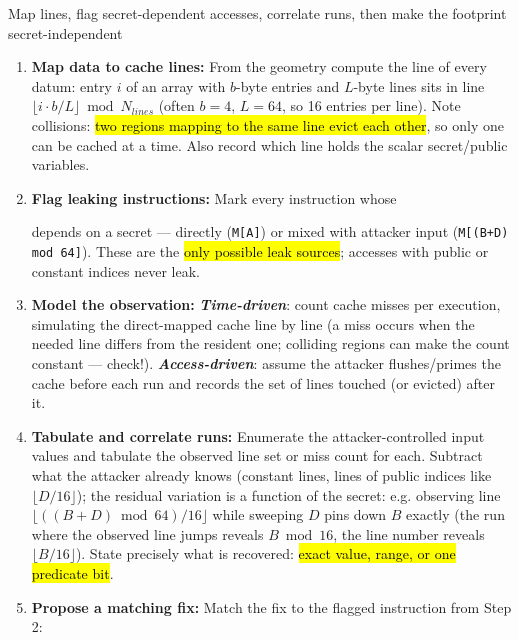 \documentclass[12pt, a4paper]{article}
\newcommand{\term}[1]{\textbf{\textit{#1}}}        %
\newcommand{\imp}[1]{\hl{#1}}                       %
\begin{document}
\begin{schemebox}{Map lines, flag secret-dependent accesses, correlate runs, then make the footprint secret-independent}
\begin{enumerate}[label=\textbf{Step \arabic*:}, leftmargin=*]
    \item \textbf{Map data to cache lines:} From the geometry compute the line of every datum: entry $i$ of an array with $b$-byte entries and $L$-byte lines sits in line $\lfloor i \cdot b / L \rfloor \bmod N_{lines}$ (often $b=4$, $L=64$, so 16 entries per line). Note collisions: \imp{two regions mapping to the same line evict each other}, so only one can be cached at a time. Also record which line holds the scalar secret/public variables.
    \item \textbf{Flag leaking instructions:} Mark every instruction whose  depends on a secret --- directly (\texttt{M[A]}) or mixed with attacker input (\texttt{M[(B+D) mod 64]}). These are the \imp{only possible leak sources}; accesses with public or constant indices never leak.
    \item \textbf{Model the observation:} \term{Time-driven}: count cache misses per execution, simulating the direct-mapped cache line by line (a miss occurs when the needed line differs from the resident one; colliding regions can make the count constant --- check!). \term{Access-driven}: assume the attacker flushes/primes the cache before each run and records the set of lines touched (or evicted) after it.
    \item \textbf{Tabulate and correlate runs:} Enumerate the attacker-controlled input values and tabulate the observed line set or miss count for each. Subtract what the attacker already knows (constant lines, lines of public indices like $\lfloor D/16 \rfloor$); the residual variation is a function of the secret: e.g. observing line $\lfloor ((B+D) \bmod 64)/16 \rfloor$ while sweeping $D$ pins down $B$ exactly (the run where the observed line jumps reveals $B \bmod 16$, the line number reveals $\lfloor B/16 \rfloor$). State precisely what is recovered: \imp{exact value, range, or one predicate bit}.
    \item \textbf{Propose a matching fix:} Match the fix to the flagged instruction from Step 2: 

\end{enumerate}
\end{schemebox}
\end{document}
